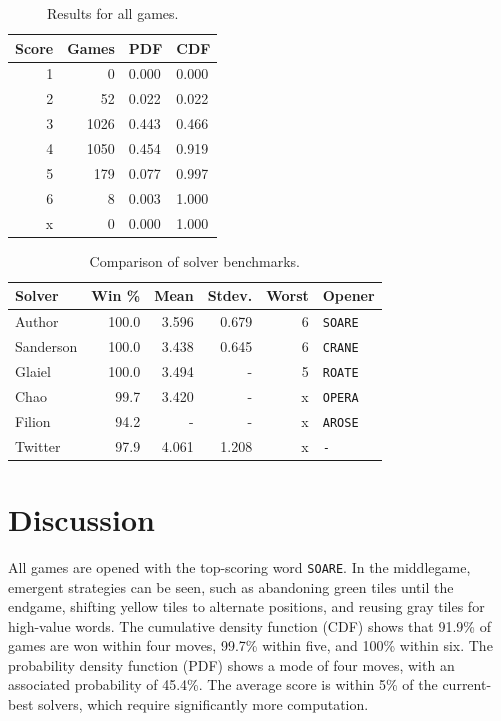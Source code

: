\documentclass[twocolumn]{tudelft-aiaa}
\begin{document}
\begin{table}[h!]
\begin{centering}
\begin{tabular}{ r | r | l | l}
\bf Score & \bf Games & \bf PDF & \bf CDF\\
\hline
1 & 0 & 0.000 & 0.000\\
2 & 52 & 0.022 & 0.022\\
3 & 1026 & 0.443 & 0.466\\
4 & 1050 & 0.454 & 0.919\\
5 & 179 & 0.077 & 0.997\\
6 & 8 & 0.003 & 1.000\\
x & 0 & 0.000 & 1.000\\
\end{tabular}
\vspace{2 mm}
\caption{Results for all games.}
\label{table_results}
\end{centering}
\end{table}

\begin{table}[h!]
\begin{centering}
\setlength\tabcolsep{3pt} %
\begin{tabular}{l || r | r | r | r | l}
\bf Solver & \bf Win \% & \bf Mean & \bf Stdev. & \bf Worst & \bf Opener\\
\hline \hline
Author\cite{Dichter} & 100.0 & 3.596 & 0.679 & 6 & \texttt{SOARE}\\ \hline
Sanderson\cite{Sanderson} & 100.0 & 3.438 & 0.645 & 6 & \texttt{CRANE}\\
Glaiel\cite{Glaiel} & 100.0 & 3.494 & - & 5 & \texttt{ROATE}\\
Chao\cite{Chao} & 99.7 & 3.420 & - & x & \texttt{OPERA}\\
Filion\cite{Filion} & 94.2 & - & - & x & \texttt{AROSE}\\
Twitter\cite{WordleStats} & 97.9 & 4.061 & 1.208 & x & \texttt{-}\\
\end{tabular}
\vspace{2 mm}
\caption{Comparison of solver benchmarks.}
\label{other_solvers}
\end{centering}
\end{table}

\section{Discussion}

All games are opened with the top-scoring word \texttt{SOARE}. In the middlegame, emergent strategies can be seen, such as abandoning green tiles until the endgame, shifting yellow tiles to alternate positions, and reusing gray tiles for high-value words. The cumulative density function (CDF) shows that 91.9\% of games are won within four moves, 99.7\% within five, and 100\% within six. The probability density function (PDF) shows a mode of four moves, with an associated probability of 45.4\%. The average score is within 5\% of the current-best solvers, which require significantly more computation.
\end{document}
